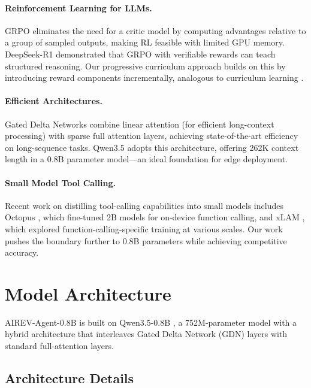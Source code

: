 \documentclass[10pt,twocolumn]{article}
\begin{document}
\paragraph{Reinforcement Learning for LLMs.}
GRPO \citep{shao2024deepseekmath} eliminates the need for a critic model by computing advantages relative to a group of sampled outputs, making RL feasible with limited GPU memory. DeepSeek-R1 \citep{guo2025deepseek} demonstrated that GRPO with verifiable rewards can teach structured reasoning. Our progressive curriculum approach builds on this by introducing reward components incrementally, analogous to curriculum learning \citep{bengio2009curriculum}.

\paragraph{Efficient Architectures.}
Gated Delta Networks \citep{yang2024gated} combine linear attention (for efficient long-context processing) with sparse full attention layers, achieving state-of-the-art efficiency on long-sequence tasks. Qwen3.5 \citep{qwen2025qwen3} adopts this architecture, offering 262K context length in a 0.8B parameter model---an ideal foundation for edge deployment.

\paragraph{Small Model Tool Calling.}
Recent work on distilling tool-calling capabilities into small models includes Octopus \citep{chen2024octopus}, which fine-tuned 2B models for on-device function calling, and xLAM \citep{zhang2024xlam}, which explored function-calling-specific training at various scales. Our work pushes the boundary further to 0.8B parameters while achieving competitive accuracy.

\section{Model Architecture}

AIREV-Agent-0.8B is built on Qwen3.5-0.8B \citep{qwen2025qwen3}, a 752M-parameter model with a hybrid architecture that interleaves Gated Delta Network (GDN) layers with standard full-attention layers.

\subsection{Architecture Details}
\end{document}
